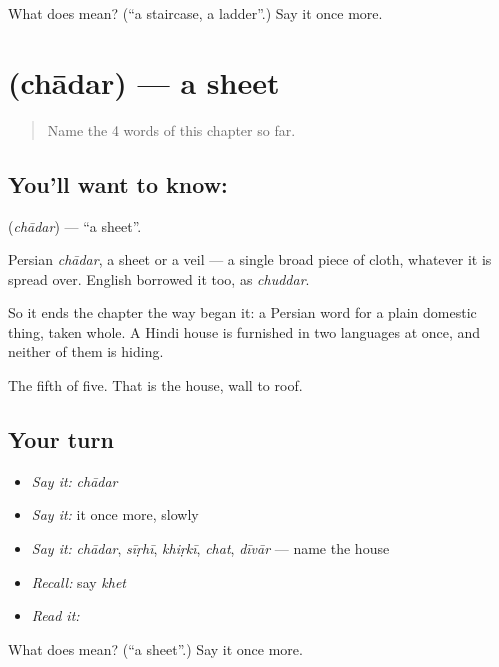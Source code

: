 \begin{tcolorbox}[breakable,colback=teal!4,colframe=teal!35!black,title={Before you move on}]
What does  mean? (\textquotedblleft{}a staircase, a ladder\textquotedblright{}.) Say it once more.
\end{tcolorbox}
\section[\texorpdfstring{\hi{चादर} (chādar)}{चादर (chādar)}]{ (chādar) — a sheet}

\label{lesson:HI-C58-sheet}



\begin{quote}
Name the 4 words of this chapter so far.
\end{quote}

\subsection*{You'll want to know: }
\textbf{} (\emph{chādar}) — \textquotedblleft{}a sheet\textquotedblright{}.

Persian \emph{chādar}, a sheet or a veil — a single broad piece of cloth, whatever it is spread over. English borrowed it too, as \emph{chuddar}.

So it ends the chapter the way  began it: a Persian word for a plain domestic thing, taken whole. A Hindi house is furnished in two languages at once, and neither of them is hiding.

\begin{grammarlens}[title={What you've built}]
The fifth of five. That is the house, wall to roof.
\end{grammarlens}

\subsection*{Your turn}
\begin{itemize}
\raggedright
  \item \emph{Say it:} \emph{chādar}
  \item \emph{Say it:} it once more, slowly
  \item \emph{Say it:} \emph{chādar}, \emph{sīṛhī}, \emph{khiṛkī}, \emph{chat}, \emph{dīvār} — name the house
  \item \emph{Recall:} say \emph{khet}
  \item \emph{Read it:} \textbf{}
\end{itemize}

\begin{tcolorbox}[breakable,colback=teal!4,colframe=teal!35!black,title={Before you move on}]
What does  mean? (\textquotedblleft{}a sheet\textquotedblright{}.) Say it once more.
\end{tcolorbox}
